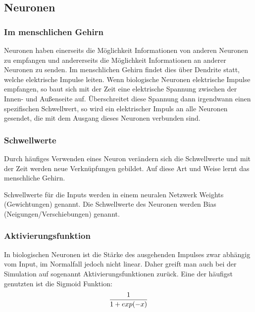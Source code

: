 \documentclass[11pt, twocolumn]{article}
\begin{document}
\subsection{Neuronen}
\subsubsection{Im menschlichen Gehirn}
Neuronen haben einerseits die Möglichkeit Informationen von anderen Neuronen zu empfangen und andererseits die Möglichkeit Informationen an anderer Neuronen zu senden. Im menschlichen Gehirn findet dies über Dendrite statt, welche elektrische Impulse leiten. Wenn biologische Neuronen elektrische Impulse empfangen, so baut sich mit der Zeit eine elektrische Spannung zwischen der Innen- und Außenseite auf. Überschreitet diese Spannung dann irgendwann einen spezifischen Schwellwert, so wird ein elektrischer Impuls an alle Neuronen gesendet, die mit dem Ausgang dieses Neuronen verbunden sind.

\subsubsection{Schwellwerte}
Durch häufiges Verwenden eines Neuron verändern sich die Schwellwerte und mit der Zeit werden neue Verknüpfungen gebildet. Auf diese Art und Weise lernt das menschliche Gehirn.

Schwellwerte für die Inputs werden in einem neuralen Netzwerk Weights (Gewichtungen) genannt. Die Schwellwerte des Neuronen werden Bias (Neigungen/Verschiebungen) genannt.

\subsubsection{Aktivierungsfunktion}
In biologischen Neuronen ist die Stärke des ausgehenden Impulses zwar abhängig vom Input, im Normalfall jedoch nicht linear. Daher greift man auch bei der Simulation auf sogenannt Aktivierungsfunktionen zurück. Eine der häufigst genutzten ist die Sigmoid Funktion:
\begin{equation}
	\centering
	\frac{1}{1 + exp(-x)}
\end{equation}
\end{document}
